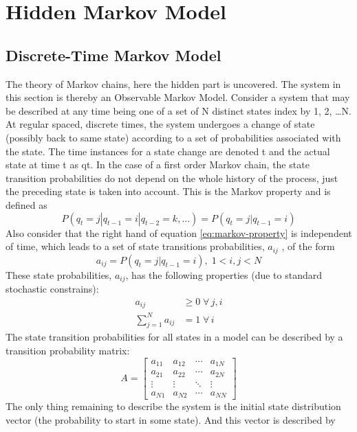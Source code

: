 \documentclass[12pt, a4paper, twoside]{report}
\begin{document}
\section{Hidden Markov Model}
\subsection{Discrete-Time Markov Model}
The theory of Markov chains, here the hidden part is uncovered. The system in this section is thereby an Observable Markov Model. Consider a system that may be described at any time being one of a set of N distinct states index by 1, 2, …N. At regular spaced, discrete times, the system undergoes a change of state (possibly back to same state) according to a set of probabilities associated with the state. The time instances for a state change are denoted t and the actual state at time t as qt. In the case of a first order Markov chain, the state transition probabilities do not depend on the whole history of the process, just the preceding state is taken into account. This is the Markov property and is defined as
\begin{equation}
P(q_{t}=j|q_{t-1}=i|q_{t-2}=k,...)=P(q_{t}=j|q_{t-1}=i)
\label{eq:markov-property}
\end{equation}
Also consider that the right hand of equation \ref{eq:markov-property} is independent of time, which leads to a set of state transitions probabilities, $a_{ij}$ , of the form
\begin{equation*}
a_{ij}=P(q_{t}=j|q_{t-1}=i),\; 1<i,j<N
\end{equation*}
These state probabilities, $a_{ij}$, has the following properties (due to standard stochastic constrains):
\begin{align*}
a_{ij} &\geq 0 \; \forall \, j,i\\ 
\sum_{j=1}^{N} a_{ij} &= 1 \; \forall \, i
\end{align*}
The state transition probabilities for all states in a model can be described by a transition probability matrix:
\begin{equation*}
A = \begin{bmatrix}
a_{11} & a_{12} & \cdots & a_{1N} \\ 
a_{21} & a_{22} & \cdots & a_{2N}\\ 
\vdots & \vdots & \ddots & \vdots \\ 
a_{N1} & a_{N2} & \cdots & a_{NN}
\end{bmatrix}
\end{equation*}
The only thing remaining to describe the system is the initial state distribution vector (the probability to start in some state). And this vector is described by
\end{document}
